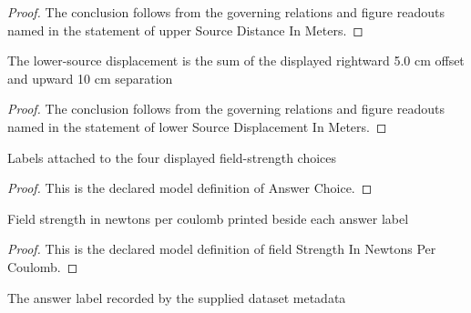 \begin{proof}
  The conclusion follows from the governing relations and figure readouts named in the statement of upper Source Distance In Meters.
\end{proof}
\begin{lemma}
  \label{lem:physics:phyx-mini-0914:phyxminiproblems-problemphyxmini0914-lowersourcedisplacementinmeters}
  The lower-source displacement is the sum of the displayed rightward 5.0 cm offset and upward 10 cm separation
\end{lemma}
\begin{proof}
  The conclusion follows from the governing relations and figure readouts named in the statement of lower Source Displacement In Meters.
\end{proof}
\begin{definition}
  \label{def:physics:phyx-mini-0914:phyxminiproblems-problemphyxmini0914-answerchoice}
  Labels attached to the four displayed field-strength choices
\end{definition}
\begin{proof}
  This is the declared model definition of Answer Choice.
\end{proof}
\begin{definition}
  \label{def:physics:phyx-mini-0914:phyxminiproblems-problemphyxmini0914-answerchoice-fieldstrengthinnewtonspercoulomb}
  Field strength in newtons per coulomb printed beside each answer label
\end{definition}
\begin{proof}
  This is the declared model definition of field Strength In Newtons Per Coulomb.
\end{proof}
\begin{definition}
  \label{def:physics:phyx-mini-0914:phyxminiproblems-problemphyxmini0914-recordeddatasetanswer}
  The answer label recorded by the supplied dataset metadata
\end{definition}
